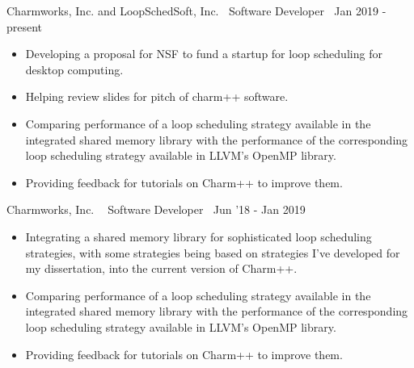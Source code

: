 {Charmworks, Inc. and LoopSchedSoft, Inc.$\>$$\>$$\>$$\> $Software Developer$\>$$\>$$\>$$\>$Jan 2019 - present}
\begin{itemize}
\item Developing a proposal for NSF to fund a startup for loop scheduling for desktop computing. 
\item Helping review slides for pitch of charm++ software. 
\item Comparing performance of a loop scheduling strategy available in the integrated shared memory library with the performance of the corresponding loop scheduling strategy available in LLVM’s OpenMP library. 
\item Providing feedback for tutorials on Charm++ to improve them. 
\end{itemize}

{Charmworks, Inc. $\>$$\>$$\>$$\>$Software Developer$\>$$\>$$\>$$\>$Jun '18 - Jan 2019}
\begin{itemize}
\item Integrating a shared memory library for sophisticated loop scheduling strategies, with some strategies being based on strategies I’ve developed for my dissertation, into the current version
of Charm++.
\item Comparing performance of a loop scheduling strategy available in the integrated shared memory library with the performance of the corresponding loop scheduling strategy available in LLVM’s OpenMP library.
\item Providing feedback for tutorials on Charm++ to improve them.
\end{itemize}

